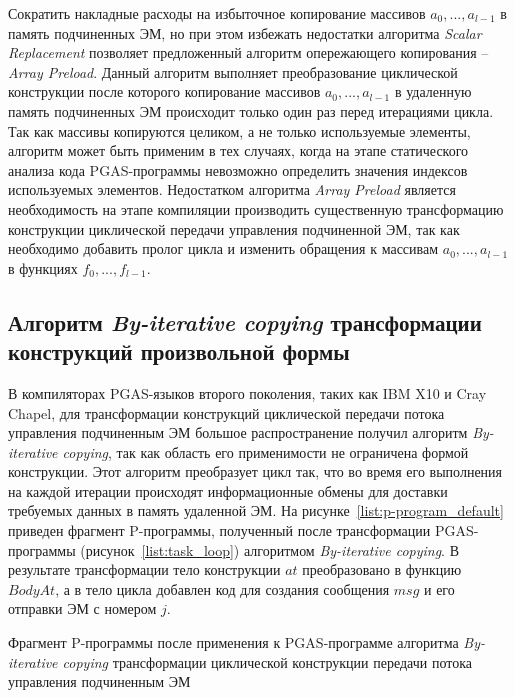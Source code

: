 Сократить накладные расходы на избыточное копирование массивов $a_{0},...,a_{l-1}$ в память подчиненных ЭМ, но при этом избежать недостатки алгоритма \textit{Scalar Replacement} позволяет предложенный алгоритм опережающего копирования -- \textit{Array Preload}. Данный алгоритм выполняет преобразование циклической конструкции после которого копирование массивов $a_{0},...,a_{l-1}$ в удаленную память подчиненных ЭМ происходит только один раз перед итерациями цикла. Так как массивы копируются целиком, а не только используемые элементы,
алгоритм может быть применим в тех случаях, когда на этапе статического анализа кода PGAS-программы невозможно определить значения индексов используемых элементов. Недостатком алгоритма \textit{Array Preload} является необходимость на этапе компиляции производить существенную трансформацию конструкции циклической передачи управления подчиненной ЭМ, так как необходимо добавить пролог цикла и изменить обращения к массивам $a_{0},...,a_{l-1}$ в функциях $f_{0},...,f_{l-1}$.


\subsection{Алгоритм \textit{By-iterative copying} трансформации конструкций произвольной формы}

В компиляторах PGAS-языков второго поколения, таких как IBM X10 и Cray Chapel, для трансформации конструкций циклической передачи потока управления подчиненным ЭМ большое распространение получил алгоритм \textit{By-iterative copying}, так как область его применимости не ограничена формой конструкции. Этот алгоритм преобразует цикл так, что во время его выполнения на каждой итерации происходят информационные обмены для доставки требуемых данных в память удаленной ЭМ. На рисунке~\ref{list:p-program_default} приведен фрагмент P-программы, полученный после трансформации PGAS-программы (рисунок~\ref{list:task_loop}) алгоритмом \textit{By-iterative copying}. В результате трансформации тело конструкции $at$ преобразовано в функцию $BodyAt$, а в тело цикла добавлен код для создания сообщения $msg$ и его отправки ЭМ с номером $j$.

\begin{ListingEnv}[!ht]
  
    \caption{Фрагмент P-программы после применения к PGAS-программе алгоритма \textit{By-iterative copying} трансформации циклической конструкции передачи потока управления подчиненным ЭМ}
    \label{list:p-program_default}
\end{ListingEnv}


